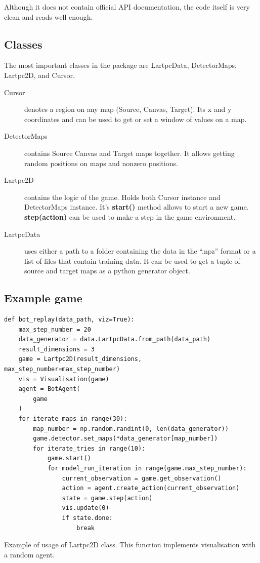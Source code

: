 Although it does not contain official API documentation, the code itself is very clean and reads well enough.

\subsection{Classes}

The most important classes in the package are LartpcData, DetectorMaps, Lartpc2D, and Cursor.


\begin{description}
\item[Cursor] denotes a region on any map (Source, Canvas, Target). Its x and y coordinates and can be used to get or set a window of values on a map.

\item[DetectorMaps] contains Source Canvas and Target maps together. It allows getting random positions on maps and nonzero positions.

\item[Lartpc2D] contains the logic of the game. Holds both Cursor instance and DetectorMaps instance.
It's \textbf{start()} method allows to start a new game. \textbf{step(action)} can be used to make a step in the game environment.

\item[LartpcData] uses either a path to a folder containing the data in the ``.npz'' format or a list of files that contain training data. It can be used to get a tuple of source and target maps as a python generator object.

\end{description}

\subsection{Example game}

\begin{listing}[!ht]
\begin{verbatim}
def bot_replay(data_path, viz=True):
    max_step_number = 20
    data_generator = data.LartpcData.from_path(data_path)
    result_dimensions = 3
    game = Lartpc2D(result_dimensions, max_step_number=max_step_number)
    vis = Visualisation(game)
    agent = BotAgent(
        game
    )
    for iterate_maps in range(30):
        map_number = np.random.randint(0, len(data_generator))
        game.detector.set_maps(*data_generator[map_number])
        for iterate_tries in range(10):
            game.start()
            for model_run_iteration in range(game.max_step_number):
                current_observation = game.get_observation()
                action = agent.create_action(current_observation)
                state = game.step(action)
                vis.update(0)
                if state.done:
                    break
\end{verbatim}
\caption{Example of usage of Lartpc2D class. This function implements visualisation with a random agent.}
\label{listing:rl_example}
\end{listing}


